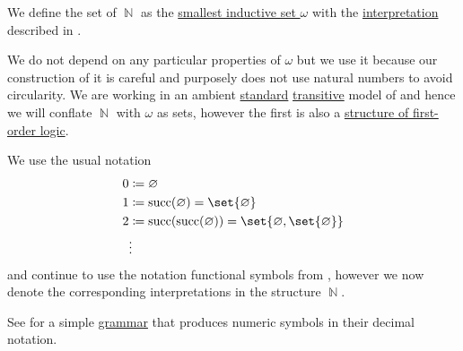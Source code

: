 \begin{definition}\label{def:set_of_natural_numbers}
  We define the set of  \( \BbbN \) as the \hyperref[thm:smallest_inductive_set_existence]{smallest inductive set \( \omega \)} with the \hyperref[def:first_order_structure/interpretation]{interpretation} described in .

  We do not depend on any particular properties of \( \omega \) but we use it because our construction of it is careful and purposely does not use natural numbers to avoid circularity. We are working in an ambient \hyperref[rem:standard_model_of_set_theory]{standard} \hyperref[rem:transitive_model_of_set_theory]{transitive} model of \hyperref[def:axiom_of_universes]{} and hence we will conflate \( \BbbN \) with \( \omega \) as sets, however the first is also a \hyperref[def:first_order_structure]{structure of first-order logic}.

  We use the usual notation
  \begin{align*}
    0 &\coloneqq \varnothing \\
    1 &\coloneqq \op{succ}(\varnothing) = \set{ \varnothing } \\
    2 &\coloneqq \op{succ}(\op{succ}(\varnothing)) = \set{ \varnothing, \set{ \varnothing } } \\
      &\vdots
  \end{align*}
  and continue to use the notation functional symbols from , however we now denote the corresponding interpretations in the structure \( \BbbN \).

  See  for a simple \hyperref[def:grammar]{grammar} that produces numeric symbols in their decimal notation.
\end{definition}

